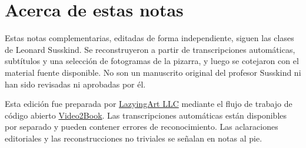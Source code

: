 \documentclass[11pt,oneside]{book}
\begin{document}
\frontmatter
\hypersetup{pageanchor=false}

\hypersetup{pageanchor=true}

\clearpage
\chapter{Acerca de estas notas}
Estas notas complementarias, editadas de forma independiente, siguen las clases de Leonard Susskind. Se reconstruyeron a partir de transcripciones automáticas, subtítulos y una selección de fotogramas de la pizarra, y luego se cotejaron con el material fuente disponible. No son un manuscrito original del profesor Susskind ni han sido revisadas ni aprobadas por él.

Esta edición fue preparada por \href{https://lazying.art}{LazyingArt LLC} mediante el flujo de trabajo de código abierto \href{https://github.com/lachlanchen/Video2Book}{Video2Book}. Las transcripciones automáticas están disponibles por separado y pueden contener errores de reconocimiento. Las aclaraciones editoriales y las reconstrucciones no triviales se señalan en notas al pie.
\clearpage
\tableofcontents
\mainmatter










\end{document}
